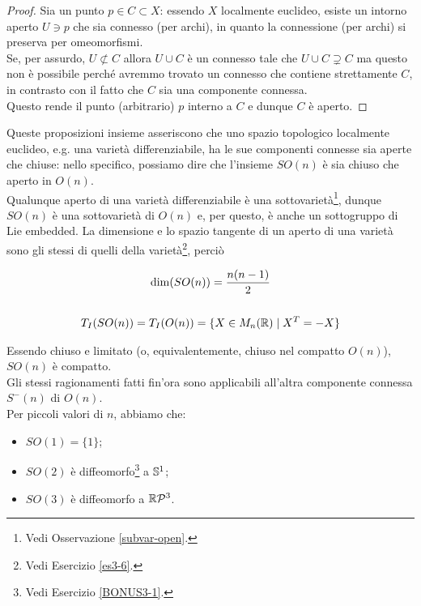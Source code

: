 \begin{proof}
	Sia un punto $ p \in C \subset X $: essendo $ X $ localmente euclideo, esiste un intorno aperto $ U \ni p $ che sia connesso (per archi), in quanto la connessione (per archi) si preserva per omeomorfismi.\\
	Se, per assurdo, $ U \not\subset C $ allora $ U \cup C $ è un connesso tale che $ U \cup C \supsetneq C $ ma questo non è possibile perché avremmo trovato un connesso che contiene strettamente $ C $, in contrasto con il fatto che $ C $ sia una componente connessa.\\
	Questo rende il punto (arbitrario) $ p $ interno a $ C $ e dunque $ C $ è aperto.
\end{proof}

Queste proposizioni insieme asseriscono che uno spazio topologico localmente euclideo, e.g. una varietà differenziabile, ha le sue componenti connesse sia aperte che chiuse: nello specifico, possiamo dire che l'insieme $ SO(n) $ è sia chiuso che aperto in $ O(n) $.\\
Qualunque aperto di una varietà differenziabile è una sottovarietà\footnote{%
	Vedi Osservazione \ref{subvar-open}.%
}, dunque $ SO(n) $ è una sottovarietà di $ O(n) $ e, per questo, è anche un sottogruppo di Lie embedded. La dimensione e lo spazio tangente di un aperto di una varietà sono gli stessi di quelli della varietà\footnote{%
	Vedi Esercizio \ref{es3-6}.%
}, perciò

\begin{gather}
	\dim(SO(n)) = \dfrac{n(n-1)}{2} \\
	\nonumber \\
	T_{I}(SO(n)) = T_{I}(O(n)) = \{ X \in M_{n}(\R) \mid X^{T} = -X \}
\end{gather}

Essendo chiuso e limitato (o, equivalentemente, chiuso nel compatto $ O(n) $), $ SO(n) $ è compatto.\\
Gli stessi ragionamenti fatti fin'ora sono applicabili all'altra componente connessa $ S^{-}(n) $ di $ O(n) $.\\
Per piccoli valori di $ n $, abbiamo che:

\begin{itemize}
	\item $ SO(1) = \{ 1 \} $;
	
	\item $ SO(2) $ è diffeomorfo\footnote{%
		Vedi Esercizio \ref{BONUS3-1}.%
	} a $ \S^{1} $;
	
	\item $ SO(3) $ è diffeomorfo a $ \rp{3} $.
\end{itemize}

